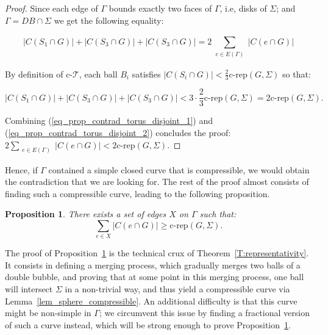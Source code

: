 \documentclass[11pt,a4paper]{article}
\newcommand\oper[4]{#1 \limits_{\substack{#2}}^{#3}{#4}}
\newcommand{\comprep}{\text{c-rep}}
\newcommand{\cT}{\text{c-}\mathcal{T}}
\newtheorem{proposition}[theorem]{Proposition}
\begin{document}
\begin{proof}
Since each edge of $\Gamma$ bounds exactly two faces of $\Gamma$, i.e, disks of $\Sigma$; and $\Gamma = DB \cap \Sigma$ we get the following equality:

\begin{equation}\label{eq_prop_contrad_torus_disjoint_1}
|C(S_1 \cap G)| + |C(S_3 \cap G)| + |C(S_3 \cap G)| = 2\oper{\sum}{e \in E(\Gamma)}{}{|C(e \cap G)|}
\end{equation}

By definition of $\cT$, each ball $B_i$ satisfies $|C(S_i \cap G)| < \frac{2}{3} \comprep (G,\Sigma)$ so that:

\begin{equation}\label{eq_prop_contrad_torus_disjoint_2}
|C(S_1 \cap G)| + |C(S_3 \cap G)| + |C(S_3 \cap G)| < 3 \cdot \frac{2}{3} \comprep (G,\Sigma) = 2 \comprep (G,\Sigma).
\end{equation}

Combining (\ref{eq_prop_contrad_torus_disjoint_1}) and (\ref{eq_prop_contrad_torus_disjoint_2}) concludes the proof: $2\oper{\sum}{e \in E(\Gamma)}{}{|C(e \cap G)|} < 2 \comprep (G,\Sigma)$.
\end{proof}

Hence, if $\Gamma$ contained a simple closed curve that is compressible, we would obtain the contradiction that we are looking for. The rest of the proof almost consists of finding such a compressible curve, leading to the following proposition.

\begin{proposition}\label{prop_1cur_compress}
There exists a set of edges $X$ on $\Gamma$ such that:
\begin{equation*}
\sum_{e \in X} |C(e \cap G)| \geq \comprep(G,\Sigma).
\end{equation*}
\end{proposition}

The proof of Proposition~\ref{prop_1cur_compress} is the technical crux of Theorem~\ref{T:representativity}. It consists in defining a merging process, which gradually merges two balls of a double bubble, and proving that at some point in this merging process, one ball will intersect $\Sigma$ in a non-trivial way, and thus yield a compressible curve via Lemma~\ref{lem_sphere_compressible}. An additional difficulty is that this curve might be non-simple in $\Gamma$;  we circumvent this issue by finding a fractional version of such a curve instead, which will be strong enough to prove Proposition~\ref{prop_1cur_compress}.
\end{document}
